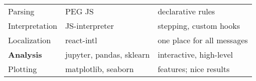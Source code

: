 \begin{center}
\begin{tabular}{l l l}
Parsing & PEG JS & declarative rules \\  %
Interpretation & JS-interpreter & stepping, custom hooks \\
Localization & react-intl & one place for all messages \\
\hline
\textbf{Analysis} & jupyter, pandas, sklearn & interactive, high-level \\
Plotting & matplotlib, seaborn & features; nice results \\
\bottomrule
\end{tabular}
\end{center}

